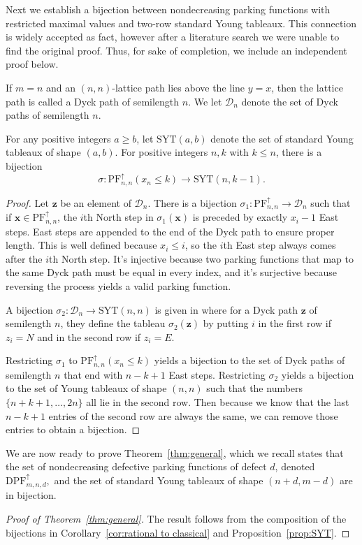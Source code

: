 \documentclass[11pt,reqno]{BICA}
\theoremstyle{definition}
\newcommand{\NDPF}{\mathrm{PF}^{\uparrow}}
\newcommand{\DPF}{\mathrm{DPF}}
\newcommand{\x}{\mathbf{x}}
\newcommand{\z}{\mathbf{z}}
\newcommand{\SYT}{\mathrm{SYT}}
\begin{document}
Next we establish a bijection between nondecreasing parking functions with restricted maximal values and two-row standard Young tableaux. This connection is widely accepted as fact, however after a literature search we were unable to find the original proof. Thus, for sake of completion, we include an independent proof below.

If $m=n$ and an $(n,n)$-lattice path lies above the line $y=x$, then the lattice path is called a Dyck path of semilength $n$. 
We let $\mathcal{D}_n$ denote the set of Dyck paths of semilength $n$.

\begin{proposition}\label{prop:SYT}
For any positive integers $a\geq b$, let $\SYT(a, b)$ denote the set of standard Young tableaux of shape $(a,b)$. For positive integers $n, k$ with $k \leq n$, there is a bijection
    \[\sigma: \NDPF_{n,n}(x_n \leq k) \to \SYT(n, k - 1).\]
\end{proposition}
\begin{proof}
    Let $\z$ be an element of $\mathcal{D}_n$. There is a bijection $\sigma_1: \NDPF_{n,n} \to \mathcal{D}_n$ such that if $\x \in \NDPF_{n,n}$, the $i$th North step in $\sigma_1(\x)$ is preceded by exactly $x_i - 1$ East steps. East steps are appended to the end of the Dyck path to ensure proper length. This is well defined because $x_i \leq i$, so the $i$th East step always comes after the $i$th North step. It's injective because two parking functions that map to the same Dyck path must be equal in every index, and it's surjective because reversing the process yields a valid parking function.
    
A bijection $\sigma_2:\mathcal{D}_n\to \SYT(n,n)$ is given in \cite[Page 1]{DyckPathsSYT} where 
for a Dyck path $\z$ of semilength $n$, they define the tableau $\sigma_2(\z)$ by putting $i$ in the first row if $z_i = N$ and in the second row if $z_i = E$.
    
    Restricting $\sigma_1$ to $\NDPF_{n,n}(x_n \leq k)$ yields a bijection to the set of Dyck paths of semilength $n$ that end with $n-k+1$ East steps. Restricting $\sigma_2$ yields a bijection to the set of Young tableaux of shape $(n,n)$ such that the numbers $\{n+k+1, \ldots, 2n\}$ all lie in the second row. Then because we know that the last $n-k+1$ entries of the second row are always the same, we can remove those entries to obtain a bijection.
\end{proof}


We are now ready to prove Theorem~\ref{thm:general}, which we recall states that the set of nondecreasing defective parking functions of defect $d$, denoted $\DPF_{m,n,d}^{\uparrow},$ and the set of standard Young tableaux of shape $(n+d,m-d)$ are in bijection. 
\begin{proof}[Proof of Theorem~\ref{thm:general}]
The result follows from the composition of the bijections in Corollary~\ref{cor:rational to classical} and Proposition~\ref{prop:SYT}.
\end{proof}
\end{document}
